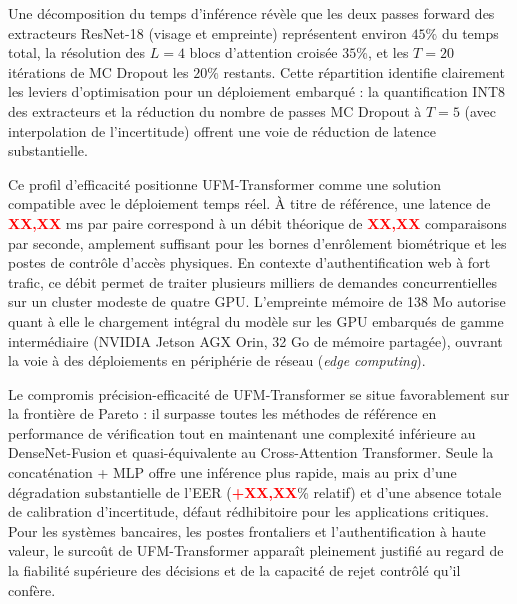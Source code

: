 \documentclass[12pt,a4paper]{report}
\begin{document}
Une d\'{e}composition du temps d'inf\'{e}rence r\'{e}v\`{e}le que les deux passes forward des extracteurs ResNet-18 (visage et empreinte) repr\'{e}sentent environ $45\%$ du temps total, la r\'{e}solution des $L = 4$ blocs d'attention crois\'{e}e $35\%$, et les $T = 20$ it\'{e}rations de MC Dropout les $20\%$ restants. Cette r\'{e}partition identifie clairement les leviers d'optimisation pour un d\'{e}ploiement embarqu\'{e} : la quantification INT8 des extracteurs et la r\'{e}duction du nombre de passes MC Dropout \`{a} $T = 5$ (avec interpolation de l'incertitude) offrent une voie de r\'{e}duction de latence substantielle.

Ce profil d'efficacit\'{e} positionne UFM-Transformer comme une solution compatible avec le d\'{e}ploiement temps r\'{e}el. \`{A} titre de r\'{e}f\'{e}rence, une latence de \textcolor{red}{\textbf{XX,XX}} ms par paire correspond \`{a} un d\'{e}bit th\'{e}orique de \textcolor{red}{\textbf{XX,XX}} comparaisons par seconde, amplement suffisant pour les bornes d'enr\^{o}lement biom\'{e}trique et les postes de contr\^{o}le d'acc\`{e}s physiques. En contexte d'authentification web \`{a} fort trafic, ce d\'{e}bit permet de traiter plusieurs milliers de demandes concurrentielles sur un cluster modeste de quatre GPU. L'empreinte m\'{e}moire de 138 Mo autorise quant \`{a} elle le chargement int\'{e}gral du mod\`{e}le sur les GPU embarqu\'{e}s de gamme interm\'{e}diaire (NVIDIA Jetson AGX Orin, 32 Go de m\'{e}moire partag\'{e}e), ouvrant la voie \`{a} des d\'{e}ploiements en p\'{e}riph\'{e}rie de r\'{e}seau (\textit{edge computing}).

Le compromis pr\'{e}cision-ef\-fi\-ca\-cit\'{e} de UFM-Transformer se situe favorablement sur la fronti\`{e}re de Pareto : il surpasse toutes les m\'{e}thodes de r\'{e}f\'{e}rence en performance de v\'{e}rification tout en maintenant une complexit\'{e} inf\'{e}rieure au DenseNet-Fusion et quasi-\'{e}quivalente au Cross-Attention Transformer. Seule la concat\'{e}nation + MLP offre une inf\'{e}rence plus rapide, mais au prix d'une d\'{e}gradation substantielle de l'EER (\textcolor{red}{\textbf{+XX,XX}}\% relatif) et d'une absence totale de calibration d'incertitude, d\'{e}faut r\'{e}dhibitoire pour les applications critiques. Pour les syst\`{e}mes bancaires, les postes frontaliers et l'authentification \`{a} haute valeur, le surco\^{u}t de UFM-Transformer appara\^{i}t pleinement justifi\'{e} au regard de la fiabilit\'{e} sup\'{e}rieure des d\'{e}cisions et de la capacit\'{e} de rejet contr\^{o}l\'{e} qu'il conf\`{e}re.
\end{document}
